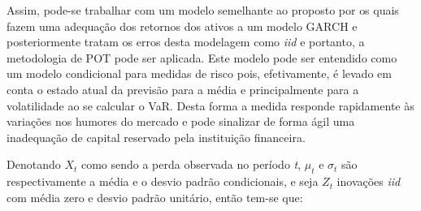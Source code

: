 \documentclass[1p]{elsarticle}
\theoremstyle{definition}
\begin{document}
Assim, pode-se trabalhar com um modelo semelhante ao proposto por \cite{McNeil2000} os quais fazem uma adequação dos retornos dos ativos a um modelo GARCH e posteriormente tratam os erros desta modelagem como \emph{iid} e portanto, a metodologia de POT pode ser aplicada. Este modelo pode ser entendido como um modelo condicional para medidas de risco pois, efetivamente, é levado em conta o estado atual da previsão para a média e principalmente para a volatilidade ao se calcular o VaR. Desta forma a medida responde rapidamente às variações nos humores do mercado e pode sinalizar de forma ágil uma inadequação de capital reservado pela instituição financeira.





Denotando $X_t$ como sendo a perda observada no período \emph{t}, $\mu_t$ e $\sigma_t$ são respectivamente a média e o desvio padrão condicionais, e seja $Z_t$ inovações \emph{iid} com média zero e desvio padrão unitário, então tem-se que:
\end{document}
